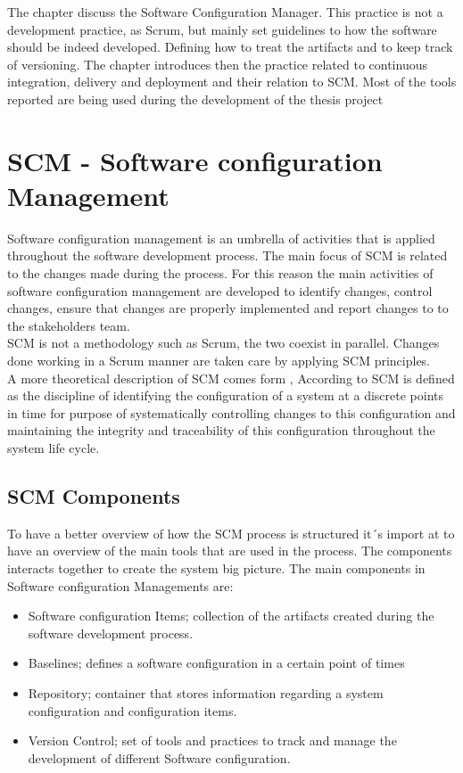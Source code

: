 \documentclass[../main.tex]{subfiles}
\begin{document}
The chapter discuss the Software Configuration Manager. This practice is not a development practice, as Scrum, but mainly set guidelines to how the software should be indeed developed. Defining how to treat the artifacts and to keep track of versioning. The chapter introduces then the practice related to continuous integration, delivery and deployment and their relation to SCM. Most of the tools reported are being used during the development of the thesis project 
\section{SCM - Software configuration Management}
Software configuration management is an umbrella of activities that is applied throughout the software development process. The main focus of SCM is related to the changes made during the process. For this reason the main activities of software configuration management are developed to identify changes, control changes, ensure that changes are properly implemented and report changes to to the stakeholders team.\\
SCM is not a methodology such as Scrum, the two coexist in parallel. Changes done working in a Scrum manner are taken care by applying SCM principles.\\
A more theoretical description of SCM comes form \cite{10.1007/978-3-319-32467-8_110}, According to \citet{10.1007/978-3-319-32467-8_110} SCM is defined as the discipline of identifying the configuration of a system at a discrete points in time for purpose of systematically controlling changes to this configuration and maintaining the integrity and traceability of this configuration throughout the system life cycle.
\subsection{SCM Components}
To have a better overview of how the SCM process is structured it´s import at to have an overview of the main tools that are used in the process. The components interacts together to create the system big picture. The main components in Software configuration Managements are:
\begin{itemize}
    \item Software configuration Items; collection of the artifacts created during the software development process. 
    \item Baselines; defines a software configuration in a certain point of times
    \item Repository; container that stores information regarding a system configuration and configuration items. 
    \item Version Control; set of tools and practices to track and manage the development of different Software configuration. 
\end{itemize}
\end{document}

